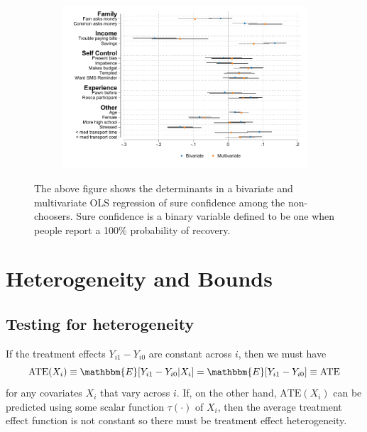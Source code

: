 \begin{figure}[H]
    \caption{Determinants sure confidence}
    \label{determinants_sure}
    \begin{center}
    \begin{subfigure}{0.75\textwidth}
        \centering
        \includegraphics[width=\textwidth]{Figuras/determinants_confidence_100.pdf}
    \end{subfigure}
    \end{center}
      \scriptsize

      The above figure shows the determinants in a bivariate and multivariate OLS regression of sure confidence among the non-choosers. Sure confidence is a binary variable defined to be one when people report a 100\% probability of recovery.
\end{figure}




\cleardoublepage





\section{Heterogeneity and Bounds}

\subsection{Testing for heterogeneity}
\label{append:chernozhukov}
If the treatment effects $Y_{i1} - Y_{i0}$ are constant across $i$, then we must have
\[
\text{ATE}(X_i) \equiv \mathbbm{E}[Y_{i1} - Y_{i0} |X_i] = \mathbbm{E}[Y_{i1} - Y_{i0}] \equiv \text{ATE}
\]
for any covariates $X_i$ that vary across $i$. If, on the other hand, $\text{ATE}(X_i)$ can be predicted using some scalar function $\tau(\cdot)$ of $X_i$, then the average treatment effect function is not constant so there must be treatment effect heterogeneity. 


